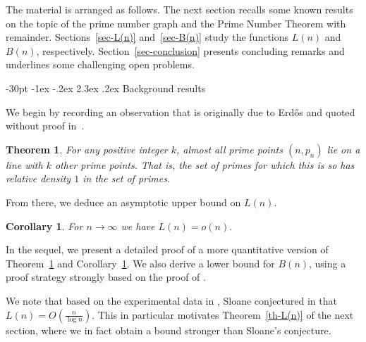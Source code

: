 \documentclass[10pt]{article}
\makeatletter
\renewcommand\section{\@startsection {section}{1}{\z@}
{-30pt \@plus -1ex \@minus -.2ex}
{2.3ex \@plus.2ex}
{\normalfont\normalsize\bfseries\boldmath}}
\newtheorem{theorem}{Theorem}
\newtheorem{corollary}{Corollary}
\theoremstyle{definition}
\theoremstyle{remark}
\numberwithin{equation}{section}
\makeatother
\begin{document}
The material is arranged as follows. The next section recalls some known results on the topic of the prime number graph and the Prime Number Theorem with remainder. Sections~\ref{sec-L(n)} and~\ref{sec-B(n)} study the functions $L(n)$ and $B(n)$, respectively.  Section~\ref{sec-conclusion} presents concluding remarks and underlines some challenging open problems.

\section{Background results} \label{sec-background}

We begin by recording an observation that is originally due to Erd\H{o}s and quoted without proof in~\cite{P}.

\begin{theorem}
\label{th-oldtheorem}
 For any positive integer $k$, almost all prime points $(n,p_n)$ lie on a line with $k$ other prime points.
 That is, the set of primes for which this is so has relative density $1$ in the set of primes.
\end{theorem}
 From there, we deduce an asymptotic upper bound on $L(n).$

\begin{corollary}
\label{cor-oldtheorem} 
 For $n \to \infty$ we have $L(n)=o(n).$ 
\end{corollary}

In the sequel, we present a detailed proof of a more quantitative version of Theorem~\ref{th-oldtheorem} and Corollary~\ref{cor-oldtheorem}. We also derive a lower bound for $B(n)$, using a proof strategy strongly based on the proof of
\cite[Theorem 4.1]{P}.

We note that based on the experimental data in \cite{O1}, Sloane conjectured in \cite{S1} that $L(n)=O(\frac{n}{\log n}).$ This in particular motivates Theorem~\ref{th-L(n)} of the next section, where we in fact obtain a bound stronger than Sloane's conjecture.
\end{document}
